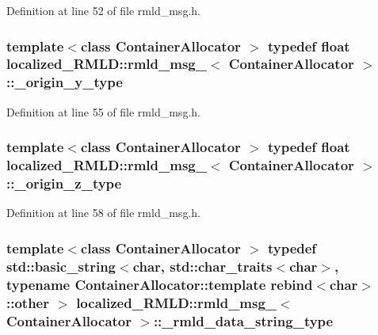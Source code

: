 Definition at line 52 of file rmld\_\-msg.h.

\subsubsection[{\_\-origin\_\-y\_\-type}]{\setlength{\rightskip}{0pt plus 5cm}template$<$class ContainerAllocator $>$ typedef float {\bf localized\_\-RMLD::rmld\_\-msg\_\-}$<$ ContainerAllocator $>$::{\bf \_\-origin\_\-y\_\-type}}\label{structlocalized__RMLD_1_1rmld__msg___a54e77f63589f61823eca64756b12f3e5}


Definition at line 55 of file rmld\_\-msg.h.

\subsubsection[{\_\-origin\_\-z\_\-type}]{\setlength{\rightskip}{0pt plus 5cm}template$<$class ContainerAllocator $>$ typedef float {\bf localized\_\-RMLD::rmld\_\-msg\_\-}$<$ ContainerAllocator $>$::{\bf \_\-origin\_\-z\_\-type}}\label{structlocalized__RMLD_1_1rmld__msg___a419fdfd5257f42cef65dd424d1af31dc}


Definition at line 58 of file rmld\_\-msg.h.

\subsubsection[{\_\-rmld\_\-data\_\-string\_\-type}]{\setlength{\rightskip}{0pt plus 5cm}template$<$class ContainerAllocator $>$ typedef std::basic\_\-string$<$char, std::char\_\-traits$<$char$>$, typename ContainerAllocator::template rebind$<$char$>$::other $>$ {\bf localized\_\-RMLD::rmld\_\-msg\_\-}$<$ ContainerAllocator $>$::{\bf \_\-rmld\_\-data\_\-string\_\-type}}\label{structlocalized__RMLD_1_1rmld__msg___a7b2a742cf6b19b35d7dff79bcf7a983c}


